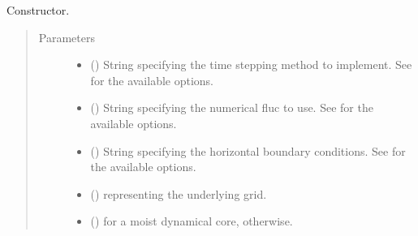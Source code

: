 \documentclass[letterpaper,10pt,english]{sphinxmanual}
\begin{document}
\begin{fulllineitems}
\begin{fulllineitems}
\label{\detokenize{api:dycore.dycore_isentropic.DynamicalCoreIsentropic.__init__}}
Constructor.
\begin{quote}\begin{description}
\item[{Parameters}] \leavevmode\begin{itemize}
\item {} 
 () \textendash{} String specifying the time stepping method to implement.
See {\hyperref[\detokenize{api:dycore.prognostic_isentropic.PrognosticIsentropic}]{}} for the available options.

\item {} 
 () \textendash{} String specifying the numerical fluc to use.
See  for the available options.

\item {} 
 () \textendash{} String specifying the horizontal boundary conditions.
See {\hyperref[\detokenize{api:dycore.horizontal_boundary.HorizontalBoundary}]{}} for the available options.

\item {} 
 () \textendash{} {\hyperref[\detokenize{api:grids.grid_xyz.GridXYZ}]{}} representing the underlying grid.

\item {} 
 () \textendash{}  for a moist dynamical core,  otherwise.


\end{itemize}
\end{description}
\end{quote}
\end{fulllineitems}
\end{fulllineitems}
\end{document}
